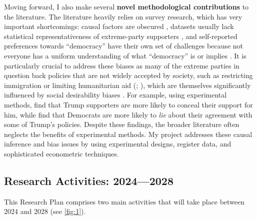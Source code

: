 \documentclass[letterpaper]{article}
\begin{document}
\vspace{2mm}Moving forward, I also make several {\bf novel methodological contributions} to the literature. The literature heavily relies on survey research, which has very important shortcomings: causal factors are obscured \parencite{King1994}, datasets usually lack statistical representativeness of extreme-party supporters \parencite{Mudde2007b}, and self-reported preferences towards ``democracy'' have their own set of challenges because not everyone has a uniform understanding of what ``democracy'' is or implies \parencite{Ananda2021}. It is particularly crucial to address these biases as many of the extreme parties in question back policies that are not widely accepted by society, such as restricting immigration or limiting humanitarian aid (\cite[p. 194]{Dehdari2022}; \cite[413]{Betz1993a}), which are themselves significantly influenced by social desirability biases \parencite{Kuklinski1997b,Kuklinski1997}. For example, using experimental methods, \textcite{Klar2016} find that Trump supporters are more likely to conceal their support for him, while \textcite{Brownback2018} find that Democrats are more likely to \emph{lie} about their agreement with some of Trump's policies. Despite these findings, the broader literature often neglects the benefits of experimental methods. My project addresses these causal inference and bias issues by using experimental designs, register data, and sophisticated econometric techniques. 

\subsection*{Research Activities: 2024---2028}

This Research Plan comprises two main activities that will take place between 2024 and 2028 (see \autoref{fig:1}).
\end{document}
